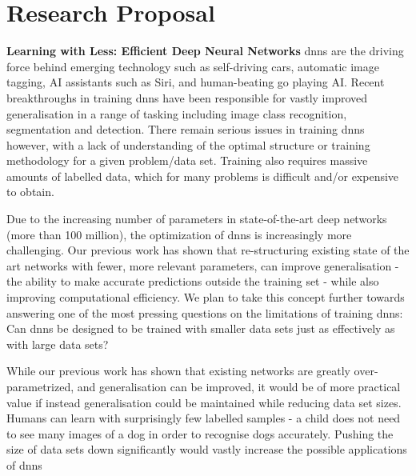 \documentclass[]{article}
\begin{document}
\section{Research Proposal}
\textbf{Learning with Less: Efficient Deep Neural Networks}
\Glspl{dnn} are the driving force behind emerging technology such as self-driving cars, automatic image tagging, AI assistants such as Siri, and human-beating go playing AI. Recent breakthroughs in training \glspl{dnn} have been responsible for vastly improved generalisation in a range of tasking including image class recognition, segmentation and detection. There remain serious issues in training \glspl{dnn} however, with a lack of understanding of the optimal structure or training methodology for a given problem/data set. Training also requires massive amounts of labelled data, which for many problems is difficult and/or expensive to obtain.

Due to the increasing number of parameters in state-of-the-art deep networks (more than 100 million), the optimization of \glspl{dnn} is increasingly more challenging. Our previous work has shown that re-structuring existing state of the art networks with fewer, more relevant parameters, can improve generalisation - the ability to make accurate predictions outside the training set - while also improving computational efficiency. We plan to take this concept further towards answering one of the most pressing questions on the limitations of training \glspl{dnn}: Can \glspl{dnn} be designed to be trained with smaller data sets just as effectively as with large data sets?

While our previous work has shown that existing networks are greatly over-parametrized, and generalisation can be improved, it would be of more practical value if instead generalisation could be maintained while reducing data set sizes. Humans can learn with surprisingly few labelled samples - a child does not need to see many images of a dog in order to recognise dogs accurately. Pushing the size of data sets down significantly would vastly increase the possible applications of \glspl{dnn}
\end{document}
